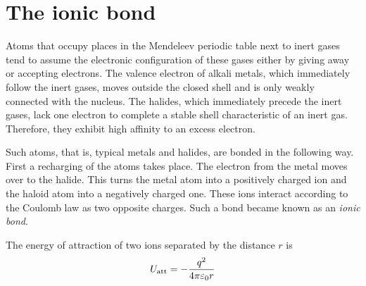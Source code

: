 \begin{table}[!b]
	\renewcommand{\arraystretch}{1.2}
	\caption{}
	\vspace{-0.6cm}
	\label{table:1_2}
	\begin{center}\end{center}
\end{table}

\section{The ionic bond}\label{sec:1_2}

Atoms that occupy places in the Mendeleev periodic table next to inert gases tend to assume the electronic configuration of these gases either by giving away or accepting electrons. The valence electron of alkali metals, which immediately follow the inert gases, moves outside the closed shell and is only weakly connected with the nucleus. The halides, which immediately precede the inert gases, lack one electron to complete a stable shell characteristic of an inert gas. Therefore, they exhibit high affinity to an excess electron.

Such atoms, that is, typical metals and halides, are bonded in the following way. First a recharging of the atoms takes place. The electron from the metal moves over to the halide. This turns the metal atom into a positively charged ion and the haloid atom into a negatively charged one. These ions interact according to the Coulomb law as two opposite charges. Such a bond became known as an \textit{ionic bond}.

The energy of attraction of two ions separated by the distance $r$ is
\begin{equation}\label{eq:1_6}
	U_{\text{att}} = - \frac{q^2}{4\pi\varepsilon_0 r}
\end{equation}

